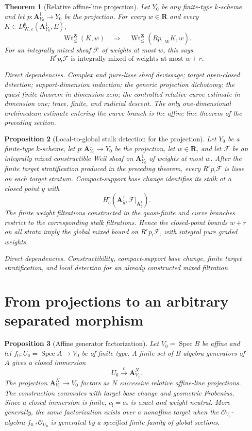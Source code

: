 \documentclass[10pt]{article}
\newtheorem{theorem}{Theorem}[section]
\newtheorem{proposition}[theorem]{Proposition}
\theoremstyle{definition}
\newcommand{\DW}{D^b_{\mathrm W,c}}
\newcommand{\IntWtLe}{\operatorname{Wt}^{\mathbf Z}_{\leq}}
\newcommand{\Spec}{\operatorname{Spec}}
\newcommand{\dep}[1]{\par\smallskip\noindent\textit{Direct dependencies.} #1\par}
\begin{document}
\begin{theorem}[Relative affine-line projection]
Let \(Y_0\) be any finite-type \(k\)-scheme and let
\(p:\mathbf A^1_{Y_0}\to Y_0\) be the projection.  For every
\(w\in\mathbf R\) and every \(K\in\DW(\mathbf A^1_{Y_0},E)\),
\[
                    \IntWtLe(K,w)\quad\Longrightarrow\quad
                    \IntWtLe(Rp_{!,\mathrm W}K,w).
\]
For an integrally mixed sheaf \(\mathcal F\) of weights at most \(w\),
this says
\[
                R^rp_!\mathcal F
        \text{ is integrally mixed of weights at most }w+r.
\]
\dep{Complex and pure-lisse sheaf devissage; target open-closed detection;
support-dimension induction; the generic projection dichotomy; the
quasi-finite theorem in dimension zero; the controlled relative-curve
estimate in dimension one; trace, finite, and radicial descent.  The only
one-dimensional archimedean estimate entering the curve branch is the
affine-line theorem of the preceding section.}
\end{theorem}

\begin{proposition}[Local-to-global stalk detection for the projection]
Let \(Y_0\) be a finite-type \(k\)-scheme, let
\(p:\mathbf A^1_{Y_0}\to Y_0\) be the projection, let
\(w\in\mathbf R\), and let \(\mathcal F\) be an integrally mixed
constructible Weil sheaf on \(\mathbf A^1_{Y_0}\) of weights at most \(w\).
After the finite target stratification produced in the preceding theorem,
every \(R^rp_!\mathcal F\) is lisse on each target stratum.  Compact-support
base change identifies its stalk at a closed point \(y\) with
\[
               H_c^r(\mathbf A^1_{\bar y},\mathcal F|_{\mathbf A^1_{\bar y}}).
\]
The finite weight filtrations constructed in the quasi-finite and curve
branches restrict to the corresponding stalk filtrations.  Hence the
closed-point bounds \(w+r\) on all strata imply the global mixed bound on
\(R^rp_!\mathcal F\), with integral pure graded weights.
\dep{Constructibility, compact-support base change, finite target
stratification, and local detection for an already constructed mixed
filtration.}
\end{proposition}

\section{From projections to an arbitrary separated morphism}

\begin{proposition}[Affine generator factorization]
Let \(V_0=\Spec B\) be affine and let
\(f_0:U_0=\Spec A\to V_0\) be of finite type.  A finite set of \(B\)-algebra
generators of \(A\) gives a closed immersion
\[
 U_0\xrightarrow{c}\mathbf A^N_{V_0}.
\]
The projection \(\mathbf A^N_{V_0}\to V_0\) factors as \(N\) successive
relative affine-line projections.  The construction commutes with target
base change and geometric Frobenius.  Since a closed immersion is finite,
\(c_!=c_*\) is exact and weight-neutral.
More generally, the same factorization exists over a nonaffine target when
the \(\mathcal O_{V_0}\)-algebra \(f_{0,*}\mathcal O_{U_0}\) is generated by a
specified finite family of global sections.
\end{proposition}
\end{document}
